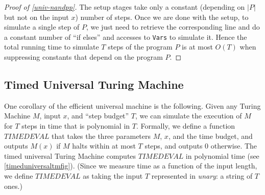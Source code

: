 \begin{proof}[Proof of \cref{univ-nandpp}]
The setup stages take only a constant (depending on \(|P|\) but not on
the input \(x\)) number of steps. Once we are done with the setup, to
simulate a single step of \(P\), we just need to retrieve the
corresponding line and do a constant number of ``if elses'' and accesses
to \texttt{Vars} to simulate it. Hence the total running time to
simulate \(T\) steps of the program \(P\) is at most \(O(T)\) when
suppressing constants that depend on the program \(P\).

\end{proof}

\subsection{Timed Universal Turing
Machine}\label{Timed-Universal-Turing-Ma}

One corollary of the efficient universal machine is the following. Given
any Turing Machine \(M\), input \(x\), and ``step budget'' \(T\), we can
simulate the execution of \(M\) for \(T\) steps in time that is
polynomial in \(T\). Formally, we define a function
\(\ensuremath{\mathit{TIMEDEVAL}}\) that takes the three parameters
\(M\), \(x\), and the time budget, and outputs \(M(x)\) if \(M\) halts
within at most \(T\) steps, and outputs \(0\) otherwise. The timed
universal Turing Machine computes \(\ensuremath{\mathit{TIMEDEVAL}}\) in
polynomial time (see \cref{timeduniversaltmfig}). (Since we measure time
as a function of the input length, we define
\(\ensuremath{\mathit{TIMEDEVAL}}\) as taking the input \(T\)
represented in \emph{unary}: a string of \(T\) ones.)

\hypertarget{timeduniversalTM}{}


